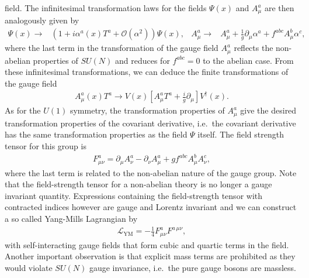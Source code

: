 field. The infinitesimal transformation laws for the fields $\Psi(x)$
and $A_\mu^a$ are then analogously given by
\begin{align}
  \Psi(x) \rightarrow & \left(1+i\alpha^a(x)T^a+\mathcal{O}(\alpha^2)\right)\Psi(x), & A_\mu^a\rightarrow & A_\mu^a + \frac{1}{g}\partial_\mu \alpha^a +
f^{abc} A_\mu^b\alpha^c,
\end{align}
where the last term in the transformation of the gauge field $A_\mu^a$
reflects the non-abelian properties of $SU(N)$ and reduces for
$f^{abc}=0$ to the abelian case. From these
infinitesimal transformations, we can deduce the finite
transformations of the gauge field
\begin{align}
   A_\mu^a(x)T^a \rightarrow   V(x)\left[A_\mu^aT^a + \frac{i}{g}\partial_\mu \right]V^\dagger(x).
\end{align}
As for the $U(1)$ symmetry, the transformation properties of $A_\mu^a$ give the
desired transformation properties of the covariant derivative,
i.e.~the covariant derivative has the same transformation properties
as the field $\Psi$ itself. The field strength tensor for this group is
\begin{align}
  F_{\mu\nu}^a=\partial_\mu A_\nu^a - \partial_\nu A_\mu^a
  +gf^{abc}A_\mu^bA_\nu^c,
\end{align}
where the last term is related to the non-abelian nature of the
gauge group. Note that the field-strength tensor for a non-abelian
theory is no longer a gauge invariant quantity. Expressions containing the field-strength tensor with contracted indices however are gauge and Lorentz invariant and we can construct a so called Yang-Mills
Lagrangian by
\begin{align}\label{eq:ymlag}
  \mathcal{L}_{\text{YM}}=-\frac{1}{4}F^a_{\mu\nu}F^{a\,\mu\nu},
\end{align}
with self-interacting gauge fields that form cubic and quartic terms in the
field. Another important observation is that explicit mass terms are prohibited as
they would violate $SU(N)$ gauge invariance, i.e.~the pure gauge
bosons are massless.


